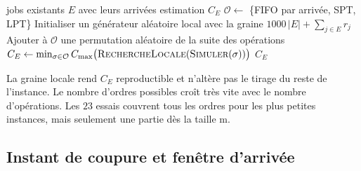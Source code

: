 \documentclass[11pt,a4paper]{article}
\newcommand{\CE}{C_E}
\begin{document}
\begin{algorithm}[ht]
\caption{\textsc{FinHeuristique}$(E)$}
\label{alg:heur}
\begin{algorithmic}[1]
\Require jobs existants $E$ avec leurs arrivées
\Ensure estimation $\CE$
\State $\mathcal{O} \gets$ \{FIFO par arrivée, SPT, LPT\} 
\State Initialiser un générateur aléatoire local avec la graine $1000\,|E| + \sum_{j \in E} r_j$
  \State Ajouter à $\mathcal{O}$ une permutation aléatoire de la suite des opérations
\EndFor
\State $\CE \gets \min_{\sigma \in \mathcal{O}} C_{\max}\big(\textsc{RechercheLocale}(\textsc{Simuler}(\sigma))\big)$
\State \Return $\CE$
\end{algorithmic}
\end{algorithm}

La graine locale rend $\CE$ reproductible et n'altère pas le tirage du reste de l'instance.
Le nombre d'ordres possibles croît très vite avec le nombre d'opérations.
Les $23$ essais couvrent tous les ordres pour les plus petites instances, mais seulement une partie dès la taille m.

\subsection{Instant de coupure et fenêtre d'arrivée}
\label{sec:cut}
\end{document}
